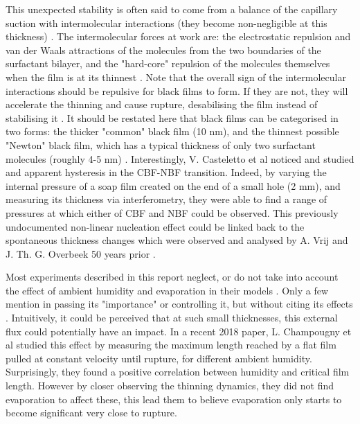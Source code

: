 \documentclass[a4paper,12pt]{article}
\numberwithin{equation}{section}
\numberwithin{figure}{section}
\numberwithin{table}{section}
\begin{document}
This unexpected stability is often said to come from a balance of the capillary suction with intermolecular interactions (they become non-negligible at this thickness) \cite{Breward2002, ChampougnyEvap2018, Cantat2010, Vrij1968, VrijDiscussion1966}. The intermolecular forces at work are: the electrostatic repulsion and van der Waals attractions of the molecules from the two boundaries of the surfactant bilayer, and the "hard-core" repulsion of the molecules themselves when the film is at its thinnest \cite{Casteletto2003}. Note that the overall sign of the intermolecular interactions should be repulsive for black films to form. If they are not, they will accelerate the thinning and cause rupture, desabilising the film instead of stabilising it \cite{VrijDiscussion1966, Langevin1994, Debregeas1998}. It should be restated here that black films can be categorised in two forms: the thicker "common" black film (10 nm), and the thinnest possible "Newton" black film, which has a typical thickness of only two surfactant molecules (roughly 4-5 nm) \cite{Casteletto2003, Seung2006}. Interestingly, V. Casteletto et al \cite{Casteletto2003} noticed and studied and apparent hysteresis in the CBF-NBF transition. Indeed, by varying the internal pressure of a soap film created on the end of a small hole (2 mm), and measuring its thickness via interferometry, they were able to find a range of pressures at which either of CBF and NBF could be observed. This previously undocumented non-linear nucleation effect could be linked back to the spontaneous thickness changes which were observed and analysed by A. Vrij and J. Th. G. Overbeek 50 years prior \cite{Vrij1968}.

Most experiments described in this report neglect, or do not take into account the effect of ambient humidity and evaporation in their models \cite{Manev1974, Zheng1983}. Only a few mention in passing its "importance" or controlling it, but without citing its effects \cite{Langevin1994}. Intuitively, it could be perceived that at such small thicknesses, this external flux could potentially have an impact. In a recent 2018 paper, L. Champougny et al \cite{ChampougnyEvap2018} studied this effect by measuring the maximum length reached by a flat film pulled at constant velocity until rupture, for different ambient humidity. Surprisingly, they found a positive correlation between humidity and critical film length. However by closer observing the thinning dynamics, they did not find evaporation to affect these, this lead them to believe evaporation only starts to become significant very close to rupture.
\end{document}

